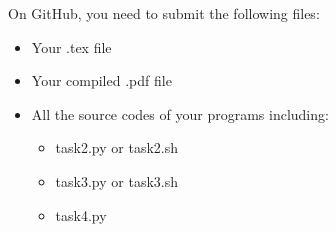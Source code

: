 \documentclass[answer]{exam}  %
\begin{document}
On GitHub, you need to submit the following files:

\begin{itemize}
    \item Your .tex file
    \item Your compiled .pdf file
    \item All the source codes of your programs including:
    \begin{itemize}
        \item task2.py or task2.sh
        \item task3.py or task3.sh
        \item task4.py
    \end{itemize}
\end{itemize}
\fi
\end{document}
